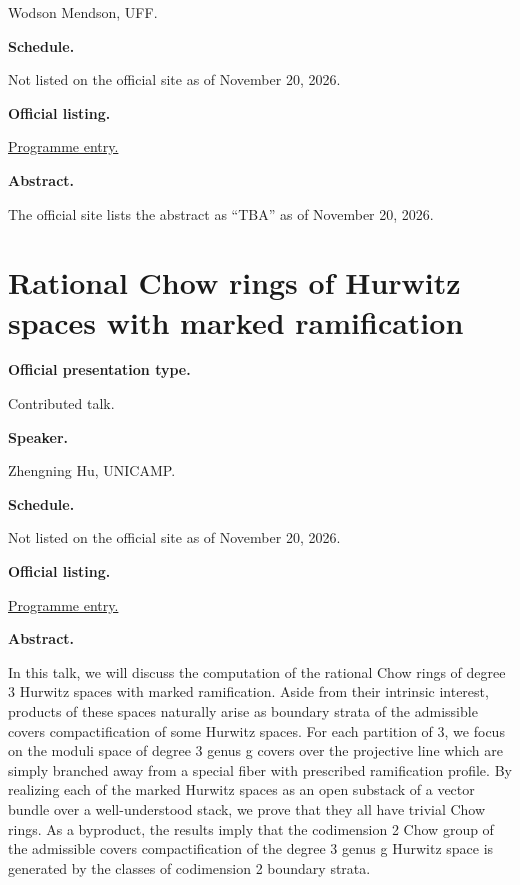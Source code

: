 Wodson Mendson, UFF.

\medskip\noindent
{\bf Schedule.}

Not listed on the official site as of
November 20, 2026.

\medskip\noindent
{\bf Official listing.}

\href{%
https://sites.google.com/view/%
geoalgcompluff/legal/%
legal-2027-resumos#h.dant8g3oe5ea%
}{Programme entry.}

\medskip\noindent
{\bf Abstract.}

The official site lists the abstract
as ``TBA'' as of November 20, 2026.

\section{Rational Chow rings of Hurwitz
spaces with marked ramification}
\label{section-rational-chow-rings-of}

\medskip\noindent
{\bf Official presentation type.}

Contributed talk.

\medskip\noindent
{\bf Speaker.}

Zhengning Hu, UNICAMP.

\medskip\noindent
{\bf Schedule.}

Not listed on the official site as of
November 20, 2026.

\medskip\noindent
{\bf Official listing.}

\href{%
https://sites.google.com/view/%
geoalgcompluff/legal/%
legal-2027-resumos#h.dant8g3oe5ea%
}{Programme entry.}

\medskip\noindent
{\bf Abstract.}

In this talk, we will discuss the computation
of the rational Chow rings of degree 3
Hurwitz spaces with marked ramification.
Aside from their intrinsic interest, products
of these spaces naturally arise as boundary
strata of the admissible covers
compactification of some Hurwitz spaces. For
each partition of 3, we focus on the moduli
space of degree 3 genus g covers over the
projective line which are simply branched
away from a special fiber with prescribed
ramification profile. By realizing each of
the marked Hurwitz spaces as an open substack
of a vector bundle over a well-understood
stack, we prove that they all have trivial
Chow rings. As a byproduct, the results imply
that the codimension 2 Chow group of the
admissible covers compactification of the
degree 3 genus g Hurwitz space is generated
by the classes of codimension 2 boundary
strata.

